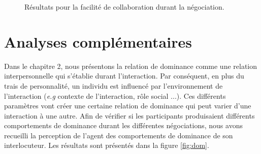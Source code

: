 	\begin{figure}[h]
		
		
		\caption{Résultats pour la facilité de collaboration durant la négociation.}
		\label{fig:aise}
	\end{figure}
	
	
	\section{Analyses complémentaires}
	Dans le chapitre 2, nous présentons la relation de dominance comme une relation interpersonnelle qui s'établie durant l'interaction. 
	Par conséquent, en plus du trais de personnalité, un individu est influencé par l'environnement de l'interaction (\textit{e.g} contexte de l'interaction, rôle social ...). Ces différents paramètres vont créer une certaine relation de dominance qui peut varier d'une interaction à une autre.  
	Afin de vérifier si les participants produisaient différents comportements de dominance durant les différentes négociations, nous avons recueilli la perception de l'agent des comportements de dominance de son interlocuteur.  Les résultats sont présentés dans la figure \ref{fig:dom}.
	

